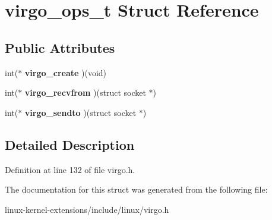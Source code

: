 \hypertarget{structvirgo__ops__t}{\section{virgo\-\_\-ops\-\_\-t Struct Reference}
\label{structvirgo__ops__t}
}
\subsection*{Public Attributes}
\begin{DoxyCompactItemize}
\item 
\hypertarget{structvirgo__ops__t_a141b6a3077800cc79e2145bdddbd761e}{int($\ast$ {\bfseries virgo\-\_\-create} )(void)}\label{structvirgo__ops__t_a141b6a3077800cc79e2145bdddbd761e}

\item 
\hypertarget{structvirgo__ops__t_a3396090e4dfcf105312cd0ef9aa7b6e5}{int($\ast$ {\bfseries virgo\-\_\-recvfrom} )(struct socket $\ast$)}\label{structvirgo__ops__t_a3396090e4dfcf105312cd0ef9aa7b6e5}

\item 
\hypertarget{structvirgo__ops__t_afddd2c29445543ad090d94e78b8a6aa3}{int($\ast$ {\bfseries virgo\-\_\-sendto} )(struct socket $\ast$)}\label{structvirgo__ops__t_afddd2c29445543ad090d94e78b8a6aa3}

\end{DoxyCompactItemize}


\subsection{Detailed Description}


Definition at line 132 of file virgo.\-h.



The documentation for this struct was generated from the following file\-:\begin{DoxyCompactItemize}
\item 
linux-\/kernel-\/extensions/include/linux/virgo.\-h\end{DoxyCompactItemize}
